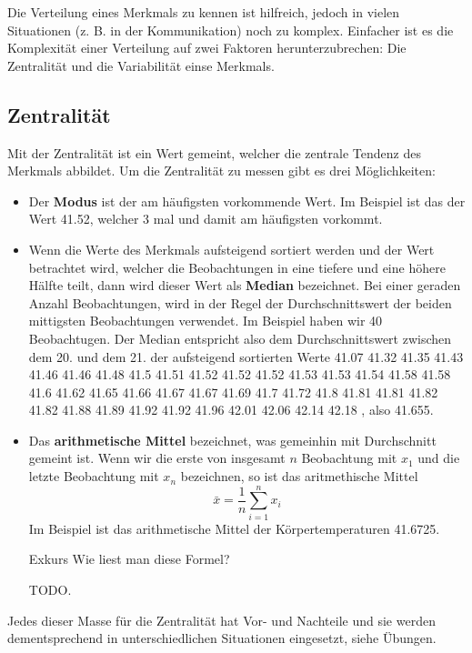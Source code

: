 \documentclass[
]{book}
\providecommand{\tightlist}{%
  \setlength{\itemsep}{0pt}\setlength{\parskip}{0pt}}
\begin{document}
Die Verteilung eines Merkmals zu kennen ist hilfreich, jedoch in vielen Situationen (z. B. in der Kommunikation) noch zu komplex. Einfacher ist es die Komplexität einer Verteilung auf zwei Faktoren herunterzubrechen: Die Zentralität und die Variabilität einse Merkmals.

\subsection{Zentralität}\label{zentralituxe4t}

Mit der Zentralität ist ein Wert gemeint, welcher die zentrale Tendenz des Merkmals abbildet. Um die Zentralität zu messen gibt es drei Möglichkeiten:

\begin{itemize}
\tightlist
\item
  Der \textbf{Modus} ist der am häufigsten vorkommende Wert. Im Beispiel ist das der Wert 41.52, welcher 3 mal und damit am häufigsten vorkommt.
\item
  Wenn die Werte des Merkmals aufsteigend sortiert werden und der Wert betrachtet wird, welcher die Beobachtungen in eine tiefere und eine höhere Hälfte teilt, dann wird dieser Wert als \textbf{Median} bezeichnet. Bei einer geraden Anzahl Beobachtungen, wird in der Regel der Durchschnittswert der beiden mittigsten Beobachtungen verwendet. Im Beispiel haben wir 40 Beobachtugen. Der Median entspricht also dem Durchschnittswert zwischen dem 20. und dem 21. der aufsteigend sortierten Werte
  41.07 41.32 41.35 41.43 41.46 41.46 41.48 41.5 41.51 41.52 41.52 41.52 41.53 41.53 41.54 41.58 41.58 41.6 41.62 41.65 41.66 41.67 41.67 41.69 41.7 41.72 41.8 41.81 41.81 41.82 41.82 41.88 41.89 41.92 41.92 41.96 42.01 42.06 42.14 42.18
  , also 41.655.
\item
  Das \textbf{arithmetische Mittel} bezeichnet, was gemeinhin mit Durchschnitt gemeint ist. Wenn wir die erste von insgesamt \(n\) Beobachtung mit \(x_1\) und die letzte Beobachtung mit \(x_n\) bezeichnen, so ist das aritmethische Mittel
  \[\bar{x} = \frac{1}{n}\sum^n_{i=1} x_i\]
  Im Beispiel ist das arithmetische Mittel der Körpertemperaturen 41.6725.

  Exkurs Wie liest man diese Formel?

  TODO.
\end{itemize}

Jedes dieser Masse für die Zentralität hat Vor- und Nachteile und sie werden dementsprechend in unterschiedlichen Situationen eingesetzt, siehe Übungen.
\end{document}
